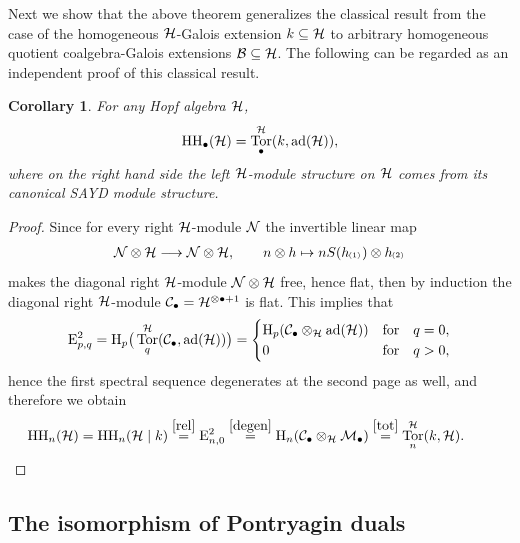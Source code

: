 \documentclass[pdftex]{sigma}
\numberwithin{equation}{section}
\newtheorem{Corollary}[Theorem]{Corollary}
\DeclareMathOperator{\ad}{ad}
\DeclareMathOperator{\Tor}{Tor}
\newcommand{\ps}[1]{~\hspace{-4pt}_{^{(#1)}}}
\begin{document}
Next we show that the above theorem generalizes the classical result from the case of the homogeneous ${\cal H}$-Galois
extension $k\subseteq{\cal H}$ to arbitrary homogeneous quotient coalgebra-Galois extensions ${\cal B}\subseteq {\cal
H}$.
The following can be regarded as an independent proof of this classical result.
\begin{Corollary}
For any Hopf algebra ${\cal H}$,
\begin{gather}
\label{aux-Hoch-Tor}
{\rm HH}_\bullet({\cal H})=\Tor^{{\cal H}}_{\bullet}(k, \ad({\cal H})),
\end{gather}
where on the right hand side the left ${\cal H}$-module structure on ${\cal H}$ comes from its canonical SAYD module
structure.
\end{Corollary}
\begin{proof}
Since for every right ${\cal H}$-module ${\cal N}$ the invertible linear map
\begin{gather*}
{\cal N}\otimes {\cal H}\longrightarrow {\cal N}\otimes {\cal H},\qquad n\otimes h\mapsto nS(h\ps{1})\otimes h\ps{2}
\end{gather*}
makes the diagonal right ${\cal H}$-module ${\cal N}\otimes {\cal H}$ free, hence f\/lat, then by induction the diagonal
right ${\cal H}$-module ${\cal C}_{\bullet}={\cal H}^{\otimes\bullet+1}$ is f\/lat.
This implies that
\begin{gather}
\label{degen}
{\rm E}^2_{p,q}={\rm H}_p\big(\Tor^{{\cal H}}_q({\cal C}_{\bullet},\ad({\cal H}))\big)=\begin{cases}
{\rm H}_p({\cal C}_{\bullet}\otimes_{{\cal H}}\ad({\cal H}))& \text{for}\quad  q=0,
\\
0 & \text{for}\quad  q>0,
\end{cases}
\end{gather}
hence the f\/irst spectral sequence degenerates at the second page as well, and therefore we obtain
\begin{gather*}%
{\rm HH}_n({\cal H})={\rm HH}_n({\cal H}\mid k) \stackrel{\eqref{rel}}{=} {\rm E}^2_{n,0}\stackrel{\eqref{degen}}{=}{\rm
H}_{n}({\cal C}_{\bullet}\otimes_{{\cal H}}{\cal M}_{\bullet})\stackrel{\eqref{tot}}{=}\Tor^{{\cal H}}_{n}(k,{\cal H}).  \tag*{\qed}
\end{gather*}
\renewcommand{\qed}{}
\end{proof}


\subsection{The isomorphism of Pontryagin duals}
\end{document}
